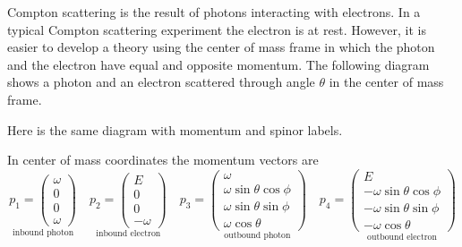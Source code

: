 \documentclass[12pt]{article}
\begin{document}
\noindent
Compton scattering is the result of photons interacting with electrons.
In a typical Compton scattering experiment the electron is at rest.
However, it is easier to develop a theory using the center of mass frame in which
the photon and the electron have equal and opposite momentum.
The following diagram shows a photon and an electron scattered through angle $\theta$
in the center of mass frame.
\begin{center}
\end{center}

\noindent
Here is the same diagram with momentum and spinor labels.
\begin{center}
\end{center}

\noindent
In center of mass coordinates the momentum vectors are
\begin{equation*}
\underset{\text{inbound photon}}
{
p_1=\begin{pmatrix}\omega\\0\\0\\ \omega\end{pmatrix}
}
\quad
\underset{\text{inbound electron}}
{
p_2=\begin{pmatrix}E\\0\\0\\-\omega\end{pmatrix}
}
\quad
p_3=
\underset{\text{outbound photon}}
{
\begin{pmatrix}
\omega\\
\omega\sin\theta\cos\phi\\
\omega\sin\theta\sin\phi\\
\omega\cos\theta
\end{pmatrix}
}
\quad
p_4=
\underset{\text{outbound electron}}
{
\begin{pmatrix}
E\\
-\omega\sin\theta\cos\phi\\
-\omega\sin\theta\sin\phi\\
-\omega\cos\theta
\end{pmatrix}
}
\end{equation*}
\end{document}
